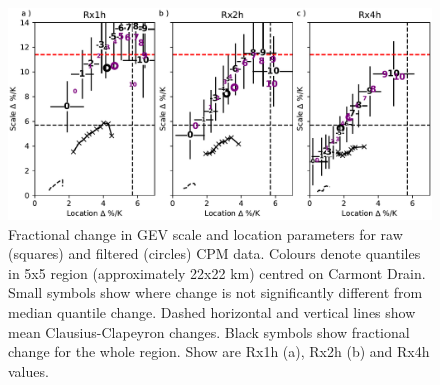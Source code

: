 \documentclass[11pt,a4paper]{article}
\begin{document}
\begin{figure}
	\centering
	\includegraphics[width=\linewidth]{carmont_gev_quant_change}
	\caption{Fractional change in GEV scale  and location parameters for raw (squares) and filtered (circles) CPM data. Colours denote quantiles in 5x5 region (approximately 22x22 km) centred on Carmont Drain. Small symbols show where change is not significantly different from median quantile change. Dashed horizontal and vertical lines show mean Clausius-Clapeyron changes. Black symbols show fractional change for the whole region.  Show are Rx1h (a), Rx2h (b) and Rx4h values.}
	\label{fig:carmon_gev_quant_change}
\end{figure}
\end{document}
